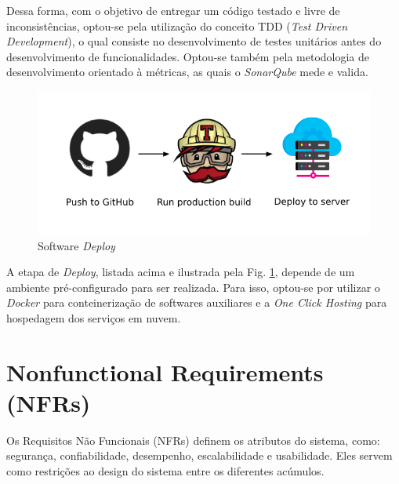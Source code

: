 
Dessa forma, com o objetivo de entregar um código testado e livre de inconsistências, optou-se pela utilização do conceito TDD (\emph{Test Driven Development}), o qual consiste no desenvolvimento de testes unitários antes do desenvolvimento de funcionalidades. Optou-se também pela metodologia de desenvolvimento orientado à métricas, as quais o \textit{SonarQube} mede e valida.

\begin{figure}[H]
    \centering
    \includegraphics[width=1.0\textwidth]{figuras/software/deploy-continuous.png}
    \caption{Software \textit{Deploy}}
    \label{fig:software_deploy}
\end{figure}

A etapa de \emph{Deploy}, listada acima e ilustrada pela Fig. \ref{fig:software_deploy}, depende de um ambiente pré-configurado para ser realizada. Para isso, optou-se por utilizar o \textit{Docker} para conteinerização de softwares auxiliares e a \textit{One Click Hosting} para hospedagem dos serviços em nuvem.

\section{Nonfunctional Requirements (NFRs) }

Os Requisitos Não Funcionais (NFRs) definem os atributos do sistema, como: segurança, confiabilidade, desempenho, escalabilidade e usabilidade. Eles servem como restrições ao design do sistema entre os diferentes acúmulos.

